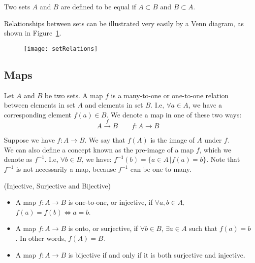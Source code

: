         Two sets $A$ and $B$ are defined to be equal if $A \subset B$ and $B \subset A$.

        Relationships between sets can be illustrated very easily by a Venn
        diagram, as shown in Figure~\ref{fig: set relations}.
        \begin{figure}
          \centering
          \texttt{[image: setRelations]}
          \caption[]{}
          \label{fig: set relations}
        \end{figure}
      \subsection*{Maps}
        \begin{definition}
          Let $A$ and $B$ be two sets. A map $f$ is a many-to-one or
          one-to-one relation between elements in set $A$ and elements in set
          $B$. I.e, $\forall a \in A$, we have a corresponding element $f(a)
          \in B$. We denote a map in one of these two ways:
          \[A \xrightarrow{f} B \quad \quad f: A \rightarrow B\]
        \end{definition}
        \begin{definition}
          Suppose we have $f: A\rightarrow B$. We say that $f(A)$ is the
          image of $A$ under $f$.\\
          We can also define a concept known as the pre-image of a map $f$,
          which we denote as $f^{-1}$. I.e, $\forall b \in B$, we have:
          $f^{-1}(b) = \{a \in A \,|f(a) = b\}$. Note that $f^{-1}$ is not necessarily a map, because $f^{-1}$ can be one-to-many.
        \end{definition}
        \begin{definition}(Injective, Surjective and Bijective)
          \begin{itemize}
            \item{A map $f: A \rightarrow B$ is one-to-one, or injective, if
            $\forall a,b \in A$, $f(a) = f(b) \Leftrightarrow a=b$.}
            \item{A map $f: A \rightarrow B$ is onto, or surjective, if
            $\forall b \in B$, $\exists a \in A$ such that $f(a) = b$. In other words, $f(A) = B$.}
            \item{A map $f: A \rightarrow B$ is bijective if and only if it is both surjective and injective.}
          \end{itemize}
        \end{definition}